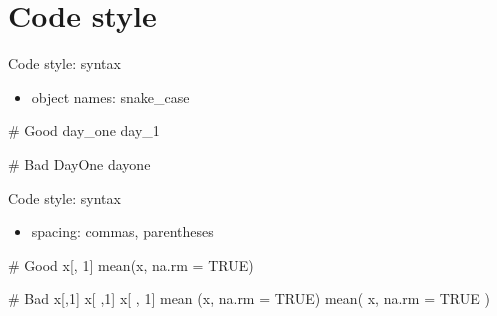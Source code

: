 \documentclass[
  ignorenonframetext,
]{beamer}
\newenvironment{Shaded}{\begin{snugshade}}{\end{snugshade}}
\newcommand{\AttributeTok}[1]{\textcolor[rgb]{0.40,0.45,0.13}{#1}}
\newcommand{\CommentTok}[1]{\textcolor[rgb]{0.37,0.37,0.37}{#1}}
\newcommand{\ConstantTok}[1]{\textcolor[rgb]{0.56,0.35,0.01}{#1}}
\newcommand{\DecValTok}[1]{\textcolor[rgb]{0.68,0.00,0.00}{#1}}
\newcommand{\FunctionTok}[1]{\textcolor[rgb]{0.28,0.35,0.67}{#1}}
\newcommand{\NormalTok}[1]{\textcolor[rgb]{0.00,0.23,0.31}{#1}}
\providecommand{\tightlist}{%
  \setlength{\itemsep}{0pt}\setlength{\parskip}{0pt}}\usepackage{longtable,booktabs,array}
\begin{document}
\hypertarget{code-style}{%
\section{Code style}\label{code-style}}

\begin{frame}[fragile]{Code style: syntax}
\protect\hypertarget{code-style-syntax}{}
\begin{itemize}
\tightlist
\item
  object names: snake\_case
\end{itemize}

\begin{Shaded}
\begin{Highlighting}[]
\CommentTok{\# Good}
\NormalTok{day\_one}
\NormalTok{day\_1}

\CommentTok{\# Bad}
\NormalTok{DayOne}
\NormalTok{dayone}
\end{Highlighting}
\end{Shaded}
\end{frame}

\begin{frame}[fragile]{Code style: syntax}
\protect\hypertarget{code-style-syntax-1}{}
\begin{itemize}
\tightlist
\item
  spacing: commas, parentheses
\end{itemize}

\begin{Shaded}
\begin{Highlighting}[]
\CommentTok{\# Good}
\NormalTok{x[, }\DecValTok{1}\NormalTok{]}
\FunctionTok{mean}\NormalTok{(x, }\AttributeTok{na.rm =} \ConstantTok{TRUE}\NormalTok{)}

\CommentTok{\# Bad}
\NormalTok{x[,}\DecValTok{1}\NormalTok{]}
\NormalTok{x[ ,}\DecValTok{1}\NormalTok{]}
\NormalTok{x[ , }\DecValTok{1}\NormalTok{]}
\FunctionTok{mean}\NormalTok{ (x, }\AttributeTok{na.rm =} \ConstantTok{TRUE}\NormalTok{)}
\FunctionTok{mean}\NormalTok{( x, }\AttributeTok{na.rm =} \ConstantTok{TRUE}\NormalTok{ )}
\end{Highlighting}
\end{Shaded}
\end{frame}
\end{document}
